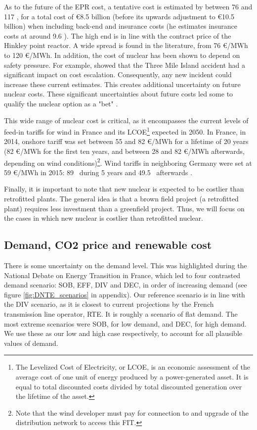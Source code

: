 As to the future of the EPR cost, a tentative cost is estimated by \citet{Boccard2014} between 76 and 117 \emwh, for a total cost of \euro 8.5 billion (before its upwards adjustment to \euro 10.5 billion) when including back-end and insurance costs (he estimates insurance costs at around 9.6 \emwh). 
The high end is in line with the contract price of the Hinkley point reactor. A wide spread is found in the literature, from 76 \euro/MWh to 120 \euro/MWh.
In addition, the cost of nuclear has been shown to depend on safety pressure. For example, \citet{Cooper2011} showed that the Three Mile Island accident had a significant impact on cost escalation.
Consequently, any new incident could increase these current estimates. This creates additional uncertainty on future nuclear costs.
These significant uncertainties about future costs led some to qualify the nuclear option as a "bet" \citep{Leveque2013}.

This wide range of nuclear cost is critical, as it encompasses the current levels of feed-in tariffs for wind in France and its LCOE\footnote{
	The Levelized Cost of Electricity, or LCOE, is an economic assessment of the average cost of one unit of energy produced by a power-generated asset. It is equal to total discounted costs divided by total discounted generation over the lifetime of the asset.}
expected in 2050. 
In France, in 2014, onshore tariff was set between 55 and 82 \euro/MWh for a lifetime of 20 years (82 \euro/MWh for the first ten years, and between 28 and 82 \euro/MWh afterwards, depending on wind conditions)\footnote{
	Note that the wind developer must pay for connection to and upgrade of the distribution network to access this FIT.
}.
Wind tariffs in neighboring Germany were set at 59 \euro/MWh in 2015: 89 \emwh\ during 5 years and 49.5 \emwh\ afterwards \citep{EEG2014}.

Finally, it is important to note that new nuclear is expected to be costlier than retrofitted plants. The general idea is that a brown field project (a retrofitted plant) requires less investment than a greenfield project. Thus, we will focus on the cases in which new nuclear is costlier than retrofitted nuclear.


\subsection{Demand, CO2 price and renewable cost}
\label{subsec:demand}

There is some uncertainty on the demand level. This was highlighted during the National Debate on Energy Transition in France, which led to four contrasted demand scenario: SOB, EFF, DIV and DEC, in order of increasing demand (see figure \ref{fig:DNTE_scenarios} in appendix). 
Our reference scenario is in line with the DIV scenario, as it is closest to current projections by the French transmission line operator, RTE. It is roughly a scenario of flat demand. The most extreme scenarios were SOB, for low demand, and DEC, for high demand. We use these as our low and high case respectively, to account for all plausible values of demand.

